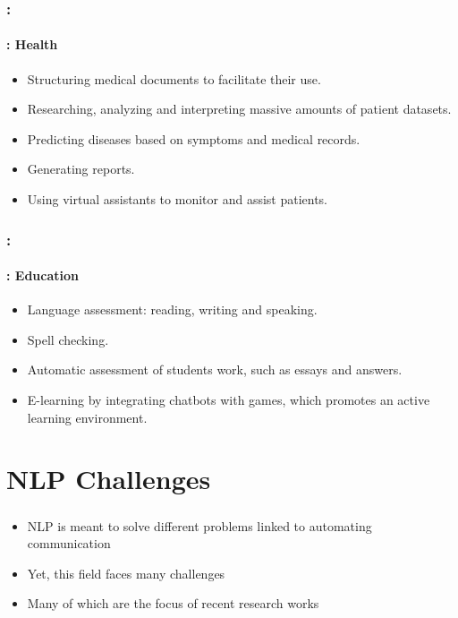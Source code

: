 \documentclass[xcolor=table]{beamer}
\begin{document}
\begin{frame}
	\frametitle{\insertshortsubtitle: \insertsection}
	\framesubtitle{\insertsubsection: Health}

	\begin{itemize}
		\item Structuring medical documents to facilitate their use.
		\item Researching, analyzing and interpreting massive amounts of patient datasets.
		\item Predicting diseases based on symptoms and medical records.
		\item Generating reports.
		\item Using virtual assistants to monitor and assist patients.
	\end{itemize}

\end{frame}

\begin{frame}
	\frametitle{\insertshortsubtitle: \insertsection}
	\framesubtitle{\insertsubsection: Education}

	\begin{itemize}
		\item Language assessment: reading, writing and speaking.
		\item Spell checking.
		\item Automatic assessment of students work, such as essays and answers.
		\item E-learning by integrating chatbots with games, which promotes an active learning environment.
	\end{itemize}

\end{frame}

\section{NLP Challenges}

\begin{frame}
	\frametitle{\insertshortsubtitle}
	\framesubtitle{\insertsection}
	
	\begin{itemize}
		\item NLP is meant to solve different problems linked to automating communication
		\item Yet, this field faces many challenges
		\item Many of which are the focus of recent research works
	\end{itemize}
	
	
\end{frame}
\end{document}
